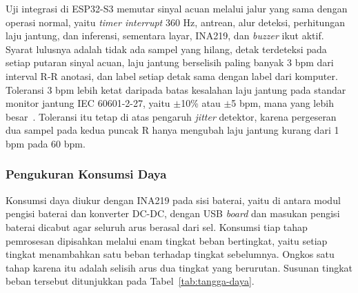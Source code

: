 Uji integrasi di ESP32-S3 memutar sinyal acuan melalui jalur yang sama dengan operasi normal, yaitu \textit{timer interrupt} 360 Hz, antrean, alur deteksi, perhitungan laju jantung, dan inferensi, sementara layar, INA219, dan \textit{buzzer} ikut aktif. Syarat lulusnya adalah tidak ada sampel yang hilang, detak terdeteksi pada setiap putaran sinyal acuan, laju jantung berselisih paling banyak 3 bpm dari interval R-R anotasi, dan label setiap detak sama dengan label dari komputer. Toleransi 3 bpm lebih ketat daripada batas kesalahan laju jantung pada standar monitor jantung IEC 60601-2-27, yaitu $\pm$10\% atau $\pm$5 bpm, mana yang lebih besar~\cite{iec_60601_2_27_2011}. Toleransi itu tetap di atas pengaruh \textit{jitter} detektor, karena pergeseran dua sampel pada kedua puncak R hanya mengubah laju jantung kurang dari 1 bpm pada 60 bpm.

\subsubsection{Pengukuran Konsumsi Daya}

Konsumsi daya diukur dengan INA219 pada sisi baterai, yaitu di antara modul pengisi baterai dan konverter DC-DC, dengan USB \textit{board} dan masukan pengisi baterai dicabut agar seluruh arus berasal dari sel. Konsumsi tiap tahap pemrosesan dipisahkan melalui enam tingkat beban bertingkat, yaitu setiap tingkat menambahkan satu beban terhadap tingkat sebelumnya. Ongkos satu tahap karena itu adalah selisih arus dua tingkat yang berurutan. Susunan tingkat beban tersebut ditunjukkan pada Tabel~\ref{tab:tangga-daya}.

